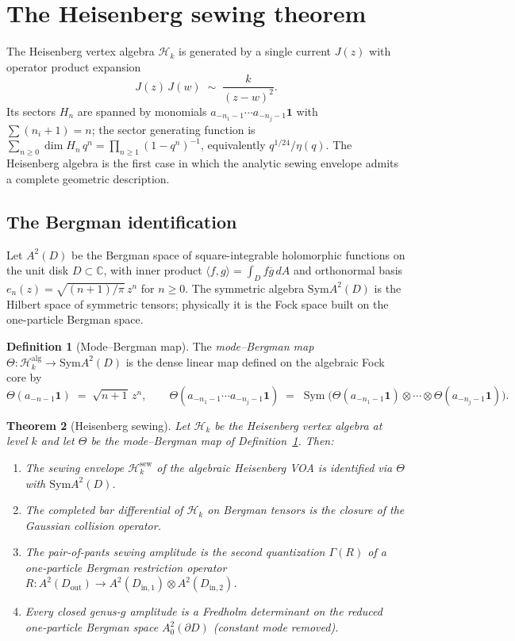 \documentclass[11pt,reqno]{amsart}
\newtheorem{theorem}{Theorem}[section]
\theoremstyle{definition}
\newtheorem{definition}[theorem]{Definition}
\theoremstyle{remark}
\newcommand{\cH}{\mathcal{H}}
\newcommand{\Sym}{\mathrm{Sym}}
\numberwithin{equation}{section}
\begin{document}
\section{The Heisenberg sewing theorem}\label{sec:heisenberg}

The Heisenberg vertex algebra $\cH_k$ is generated by a single
current $J(z)$ with operator product expansion
\[
J(z)\, J(w) \;\sim\; \frac{k}{(z-w)^2}.
\]
Its sectors $H_n$ are spanned by monomials
$a_{-n_1-1}\cdots a_{-n_j-1}\mathbf{1}$ with $\sum (n_i + 1) = n$;
the sector generating function is
$\sum_{n \geq 0} \dim H_n\,q^n = \prod_{n \geq 1}(1 - q^n)^{-1}$,
equivalently $q^{1/24}/\eta(q)$. The
Heisenberg algebra is the first case in which the analytic sewing
envelope admits a complete geometric description.

\subsection{The Bergman identification}

Let $A^2(D)$ be the Bergman space of square-integrable holomorphic
functions on the unit disk $D \subset \mathbb{C}$, with inner
product $\langle f, g \rangle = \int_D f\overline{g}\,dA$ and
orthonormal basis $e_n(z) = \sqrt{(n+1)/\pi}\,z^n$ for
$n \geq 0$. The symmetric algebra $\Sym A^2(D)$ is the Hilbert
space of symmetric tensors; physically it is the Fock space
built on the one-particle Bergman space.

\begin{definition}[Mode--Bergman map]\label{def:theta-map}
The \emph{mode--Bergman map}
$\Theta \colon \cH_k^{\mathrm{alg}} \longrightarrow \Sym A^2(D)$
is the dense linear map defined on the algebraic Fock core by
\[
\Theta(a_{-n-1}\mathbf{1})
\;=\;
\sqrt{n+1}\, z^n,
\qquad
\Theta(a_{-n_1-1}\cdots a_{-n_j-1}\mathbf{1})
\;=\;
\operatorname{Sym}\bigl(\Theta(a_{-n_1-1}\mathbf{1})
\otimes \cdots \otimes \Theta(a_{-n_j-1}\mathbf{1})\bigr).
\]
\end{definition}

\begin{theorem}[Heisenberg sewing]\label{thm:heisenberg-sewing}
Let $\cH_k$ be the Heisenberg vertex algebra at level $k$ and let
$\Theta$ be the mode--Bergman map of
Definition~\ref{def:theta-map}. Then:
\begin{enumerate}[label=\textup{(\roman*)}]
\item The sewing envelope $\cH_k^{\mathrm{sew}}$ of the algebraic
Heisenberg VOA is identified via $\Theta$ with $\Sym A^2(D)$.
\item The completed bar differential of $\cH_k$ on Bergman tensors
is the closure of the Gaussian collision operator.
\item The pair-of-pants sewing amplitude is the second
quantization $\Gamma(R)$ of a one-particle Bergman restriction
operator $R \colon A^2(D_{\mathrm{out}}) \to
A^2(D_{\mathrm{in},1}) \otimes A^2(D_{\mathrm{in},2})$.
\item Every closed genus-$g$ amplitude is a Fredholm determinant
on the reduced one-particle Bergman space
$A^2_0(\partial D)$ (constant mode removed).
\end{enumerate}
\end{theorem}
\end{document}
